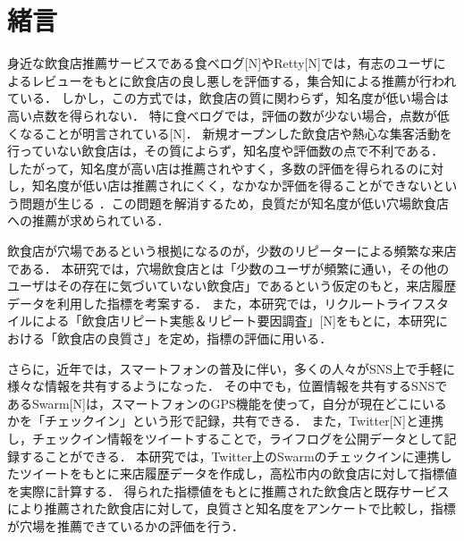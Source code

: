 \chapter{緒言}
\label{chap:intro}
身近な飲食店推薦サービスである食べログ[N]やRetty[N]では，有志のユーザによるレビューをもとに飲食店の良し悪しを評価する，集合知による推薦が行われている．
しかし，この方式では，飲食店の質に関わらず，知名度が低い場合は高い点数を得られない．
特に食べログでは，評価の数が少ない場合，点数が低くなることが明言されている[N]．
新規オープンした飲食店や熱心な集客活動を行っていない飲食店は，その質によらず，知名度や評価数の点で不利である．
したがって，知名度が高い店は推薦されやすく，多数の評価を得られるのに対し，知名度が低い店は推薦されにくく，なかなか評価を得ることができないという問題が生じる
．この問題を解消するため，良質だが知名度が低い穴場飲食店への推薦が求められている．

飲食店が穴場であるという根拠になるのが，少数のリピーターによる頻繁な来店である．
本研究では，穴場飲食店とは「少数のユーザが頻繁に通い，その他のユーザはその存在に気づいていない飲食店」であるという仮定のもと，来店履歴データを利用した指標を考案する．
また，本研究では，リクルートライフスタイルによる「飲食店リピート実態＆リピート要因調査」[N]をもとに，本研究における「飲食店の良質さ」を定め，指標の評価に用いる．

さらに，近年では，スマートフォンの普及に伴い，多くの人々がSNS上で手軽に様々な情報を共有するようになった．
その中でも，位置情報を共有するSNSであるSwarm[N]は，スマートフォンのGPS機能を使って，自分が現在どこにいるかを「チェックイン」という形で記録，共有できる．
また，Twitter[N]と連携し，チェックイン情報をツイートすることで，ライフログを公開データとして記録することができる．
本研究では，Twitter上のSwarmのチェックインに連携したツイートをもとに来店履歴データを作成し，高松市内の飲食店に対して指標値を実際に計算する．
得られた指標値をもとに推薦された飲食店と既存サービスにより推薦された飲食店に対して，良質さと知名度をアンケートで比較し，指標が穴場を推薦できているかの評価を行う．
